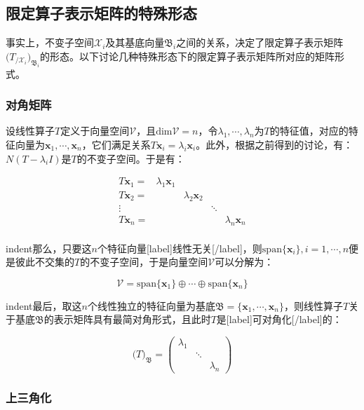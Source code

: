 \documentclass[UTF8,nofonts]{ctexart}
\begin{document}
\subsection*{限定算子表示矩阵的特殊形态}

事实上，不变子空间$\mathcal{X}_i$及其基底向量$\mathfrak{B}_i$之间的关系，决定了限定算子表示矩阵$\big(T_{/\mathcal{X}_i}\big)_{\mathfrak{B}_i}$的形态。以下讨论几种特殊形态下的限定算子表示矩阵所对应的矩阵形式。

\subsubsection*{对角矩阵}

设线性算子$T$定义于向量空间$\mathcal{V}$，且$\text{dim}\mathcal{V}=n$，令$\lambda_1,\cdots,\lambda_n$为$T$的特征值，对应的特征向量为$\boldsymbol{x}_1,\cdots,\boldsymbol{x}_n$，它们满足关系$T\boldsymbol{x}_i=\lambda_i\boldsymbol{x}_i$。此外，根据之前得到的讨论，有：$N(T-\lambda_iI)$是$T$的不变子空间。于是有：

\[
\begin{array}{cllll}
T\boldsymbol{x}_1= & \lambda_1\boldsymbol{x}_1 & & & \\
T\boldsymbol{x}_2= & & \lambda_2\boldsymbol{x}_2 & &\\
\vdots & & & \ddots &\\
T\boldsymbol{x}_n= & & & & \lambda_n\boldsymbol{x}_n\\
\end{array}
\]

indent那么，只要这$n$个特征向量[label]线性无关[/label]，则$\text{span}\{\boldsymbol{x}_i\},i=1,\cdots,n$便是彼此不交集的$T$的不变子空间，于是向量空间$\mathcal{V}$可以分解为：

\[\mathcal{V}=\text{span}\{\boldsymbol{x}_1\}\oplus\cdots\oplus\text{span}\{\boldsymbol{x}_n\}\]

indent最后，取这$n$个线性独立的特征向量为基底$\mathfrak{B}=\{\boldsymbol{x}_1,\cdots,\boldsymbol{x}_n\}$，则线性算子$T$关于基底$\mathfrak{B}$的表示矩阵具有最简对角形式，且此时$T$是[label]可对角化[/label]的：

\[
\Big(T\Big)_{\mathfrak{B}}=
\begin{pmatrix}
\lambda_1 & & \\
& \ddots & \\
& & \lambda_n
\end{pmatrix}
\]

\subsubsection*{上三角化}
\end{document}
